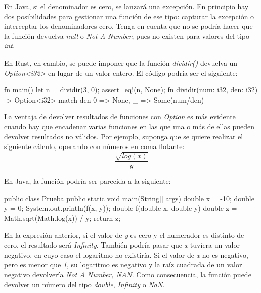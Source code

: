 En Java, si el denominador es cero, se lanzará una excepción. En principio hay dos posibilidades para gestionar una función de ese tipo: capturar la excepción o interceptar los denominadores cero. Tenga en cuenta que no se podría hacer que la función devuelva \textit{null} o \textit{Not A Number}, pues no existen para valores del tipo \textit{int}.

En Rust, en cambio, se puede imponer que la función \textit{dividir()} devuelva un \textit{Option<i32>} en lugar de un valor entero. El código podría ser el siguiente:

\vspace{0.7em}
\begin{Codigo}
   fn main() {
      let n = dividir(3, 0);
      assert_eq!(n, None);
   }
   fn dividir(num: i32, den: i32) -> Option<i32> {
      match den {
         0 => None,
         _ => Some(num/den)
      }
   }
\end{Codigo}

La ventaja de devolver resultados de funciones con \textit{Option} es más evidente cuando hay que encadenar varias funciones en las que una o más de ellas pueden devolver resultados no válidos. Por ejemplo, suponga que se quiere realizar el siguiente cálculo, operando con números en coma flotante:
\begin{equation}
   \frac{\sqrt{log(x)}}{y}   
\end{equation}

En Java, la función podría ser parecida a la siguiente:

\vspace{0.7em}
\begin{Codigo}
   public class Prueba {
      public static void main(String[] args) {
         double x = -10;
         double y = 0;
         System.out.println(f(x, y));
      }
      double f(double x, double y) {
         double z = Math.sqrt(Math.log(x)) / y;
         return z;
      }   
   }
\end{Codigo}

En la expresión anterior, si el valor de \textit{y} es cero y el numerador es distinto de cero, el resultado será \textit{Infinity}. También podría pasar que \textit{x} tuviera un valor negativo, en cuyo caso el logaritmo no existiría. Si el valor de \textit{x} no es negativo, pero es menor que \textit{1}, su logaritmo es negativo y la raíz cuadrada de un valor negativo devolvería \textit{Not A Number, NAN}. Como consecuencia, la función puede devolver un número del tipo \textit{double}, \textit{Infinity} o \textit{NaN}.


